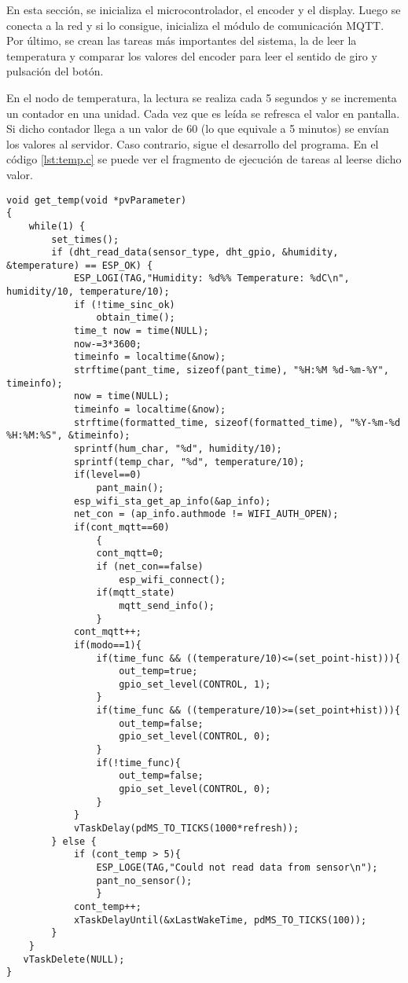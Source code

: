 En esta sección, se inicializa el microcontrolador, el encoder y el display. Luego se conecta a la red y si lo consigue, inicializa el módulo de comunicación MQTT. Por último, se crean las tareas más importantes del sistema, la de leer la temperatura y comparar los valores del encoder para leer el sentido de giro y pulsación del botón.

En el nodo de temperatura, la lectura se realiza cada 5 segundos y se incrementa un contador en una unidad. Cada vez que es leída se refresca el valor en pantalla. Si dicho contador llega a un valor de 60 (lo que equivale a 5 minutos) se envían los valores al servidor. Caso contrario, sigue el desarrollo del programa. En el código \ref{lst:temp.c} se puede ver el fragmento de ejecución de tareas al leerse dicho valor.

\begin{lstlisting}[caption={Código de lectura de temperatura.}, label={lst:temp.c}]
void get_temp(void *pvParameter)
{
    while(1) {
        set_times();
        if (dht_read_data(sensor_type, dht_gpio, &humidity, &temperature) == ESP_OK) {
            ESP_LOGI(TAG,"Humidity: %d%% Temperature: %dC\n", humidity/10, temperature/10);
            if (!time_sinc_ok)
                obtain_time();
            time_t now = time(NULL);
            now-=3*3600;
            timeinfo = localtime(&now);
            strftime(pant_time, sizeof(pant_time), "%H:%M %d-%m-%Y", timeinfo);
            now = time(NULL);
            timeinfo = localtime(&now);
            strftime(formatted_time, sizeof(formatted_time), "%Y-%m-%d %H:%M:%S", &timeinfo);
            sprintf(hum_char, "%d", humidity/10);
			sprintf(temp_char, "%d", temperature/10);
            if(level==0)
                pant_main();
            esp_wifi_sta_get_ap_info(&ap_info);
            net_con = (ap_info.authmode != WIFI_AUTH_OPEN);
            if(cont_mqtt==60)
                {
                cont_mqtt=0;
                if (net_con==false)
                    esp_wifi_connect();
                if(mqtt_state)    
                    mqtt_send_info();
                }
            cont_mqtt++;
            if(modo==1){
                if(time_func && ((temperature/10)<=(set_point-hist))){
                    out_temp=true;
                    gpio_set_level(CONTROL, 1);
                }
                if(time_func && ((temperature/10)>=(set_point+hist))){
                    out_temp=false;
                    gpio_set_level(CONTROL, 0);
                }
                if(!time_func){
                    out_temp=false;
                    gpio_set_level(CONTROL, 0);
                }
            }
            vTaskDelay(pdMS_TO_TICKS(1000*refresh));
        } else {
            if (cont_temp > 5){
                ESP_LOGE(TAG,"Could not read data from sensor\n");
			    pant_no_sensor();
                }
            cont_temp++;
            xTaskDelayUntil(&xLastWakeTime, pdMS_TO_TICKS(100));
        }
    }
   vTaskDelete(NULL);
}
\end{lstlisting}

